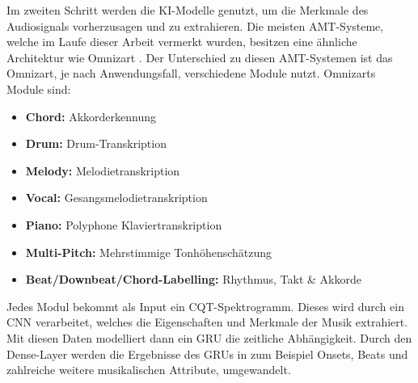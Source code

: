 Im zweiten Schritt werden die KI-Modelle genutzt, um die Merkmale des Audiosignals vorherzusagen und zu extrahieren.
Die meisten AMT-Systeme, welche im Laufe dieser Arbeit vermerkt wurden, besitzen eine ähnliche Architektur wie Omnizart \cite{hawthorne2017onsets}.
Der Unterschied zu diesen AMT-Systemen ist das Omnizart, je nach Anwendungsfall, verschiedene Module nutzt.
Omnizarts Module sind:
\begin{itemize}
    \item \textbf{Chord:} Akkorderkennung
    \item \textbf{Drum:} Drum-Transkription
    \item \textbf{Melody:} Melodietranskription
    \item \textbf{Vocal:} Gesangsmelodietranskription
    \item \textbf{Piano:} Polyphone Klaviertranskription
    \item \textbf{Multi-Pitch:} Mehrstimmige Tonhöhenschätzung
    \item \textbf{Beat/Downbeat/Chord-Labelling:} Rhythmus, Takt \& Akkorde
\end{itemize}
Jedes Modul bekommt als Input ein CQT-Spektrogramm.
Dieses wird durch ein CNN verarbeitet, welches die Eigenschaften und Merkmale der Musik extrahiert.
Mit diesen Daten modelliert dann ein GRU die zeitliche Abhängigkeit.
Durch den Dense-Layer werden die Ergebnisse des GRUs in zum Beispiel Onsets,
Beats und zahlreiche weitere musikalischen Attribute, umgewandelt.

